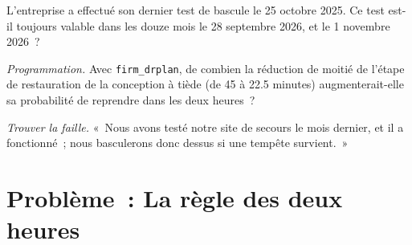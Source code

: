 \begin{exercise}[$\star\star$]\label{exo:nw:disaster-recovery-and-regulatory-requirements:6}
L'entreprise a effectué son dernier test de bascule le 25 octobre 2025. Ce test est-il toujours valable dans les douze mois le 28 septembre 2026, et le 1 novembre 2026~?
\end{exercise}

\begin{exercise}[$\star\star\star$]\label{exo:nw:disaster-recovery-and-regulatory-requirements:7}
\emph{Programmation.} Avec \texttt{firm\_drplan}, de combien la réduction de moitié de l'étape de restauration de la conception à tiède (de 45 à 22.5 minutes) augmenterait-elle
sa probabilité de reprendre dans les deux heures~?
\end{exercise}

\begin{exercise}[$\star\star\star$]\label{exo:nw:disaster-recovery-and-regulatory-requirements:8}
\emph{Trouver la faille.} «~Nous avons testé notre site de secours le mois dernier, et il a fonctionné~; nous basculerons donc dessus si une tempête survient.~»
\end{exercise}

\section{Problème~: La règle des deux heures}

